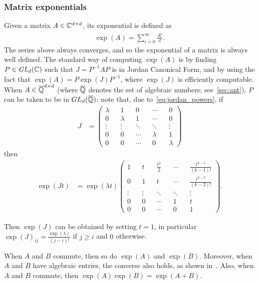 \subsubsection{Matrix exponentials}
\label{sec:matrix_exp}

Given a matrix $A \in \mathbb{C}^{d \times d}$, its exponential is defined as
\begin{align*}
\exp(A) = \sum \limits_{i=0}^{\infty} \frac{A^{i}}{i!} .
\end{align*}
The series above always converges, and so the exponential of a matrix is always well defined.
The standard way of computing $\exp(A)$ is by finding $P \in \mathit{GL}_{d}(\mathbb{C})$ such that $J=P^{-1}AP$ is in Jordan Canonical Form, and by using the fact that $\exp(A) = P \exp(J) P^{-1}$, where $\exp(J)$ is efficiently computable.
When $A \in \overline{\mathbb{Q}}^{d \times d}$ (where $\overline{\mathbb{Q}}$ denotes the set of algebraic numbers; see~\cref{sec:ant}), $P$ can be taken to be in $GL_{d}(\overline{\mathbb{Q}})$; note that, due to~\cref{eq:jordan_powers}, if
\begin{align*}
J &= \begin{pmatrix}
\lambda && 1 && 0 && \cdots && 0 \\
0 && \lambda && 1 &&\cdots && 0 \\
\vdots && \vdots && \ddots && \ddots && \vdots \\
0 && 0 && \cdots && \lambda && 1 \\
0 && 0 && \cdots && 0 && \lambda
\end{pmatrix}
\end{align*}
then
\begin{align*}
\exp(Jt) &= \exp(\lambda t) \begin{pmatrix}
1 && t && \frac{t^{2}}{2} && \cdots && \frac{t^{k-1}}{(k-1)!} \\
0 && 1 && t && \cdots && \frac{t^{k-2}}{(k-2)!} \\
\vdots && \vdots &&\ddots && \ddots && \vdots \\
0 && 0 && \cdots && 1 && t \\
0 && 0 && \cdots && 0 && 1
\end{pmatrix} .
\end{align*}

Then $\exp{(J)}$ can be obtained by setting $t=1$, in particular $\exp{(J)}_{ij} = \frac{\exp(\lambda)}{(j-i)!}$ if $j \geq i$ and $0$ otherwise.

When $A$ and $B$ commute, then so do $\exp(A)$ and $\exp(B)$. Moreover, when $A$ and $B$ have algebraic entries, the converse also holds, as shown in~\cite{MatrixExps}. Also, when $A$ and $B$ commute, then $\exp{(A)}\exp{(B)} = \exp{(A+B)}$.


